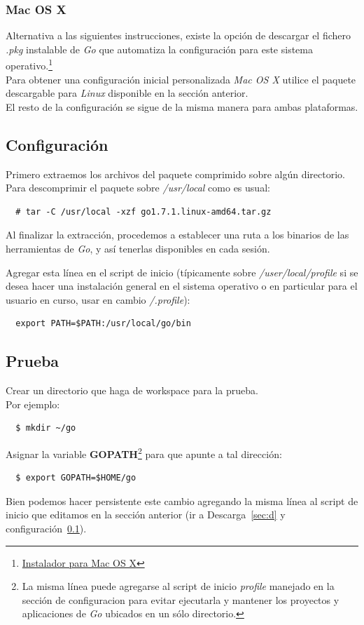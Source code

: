 \documentclass[12pt]{article}
\begin{document}
\subsubsection*{Mac OS X}
Alternativa a las siguientes instrucciones, existe la opción de descargar el fichero \textit{.pkg} instalable de \textit{Go} que automatiza la configuración para este sistema operativo.\footnote{\href{https://golang.org/doc/install?download=go1.7.1.darwin-amd64.pkg}{Instalador para Mac OS X}}\\[1mm]

Para obtener una configuración inicial personalizada \textit{Mac OS X} utilice el paquete descargable para \textit{Linux} disponible en la sección anterior.\\

El resto de la configuración se sigue de la misma manera para ambas plataformas.

\subsection{Configuración}\label{sec:c}
Primero extraemos los archivos del paquete comprimido sobre algún directorio.\\
Para descomprimir el paquete sobre \textit{/usr/local} como es usual:
\begin{verbatim}
  # tar -C /usr/local -xzf go1.7.1.linux-amd64.tar.gz
\end{verbatim}
Al finalizar la extracción, procedemos a establecer una ruta a los binarios de las herramientas de \textit{Go}, y así tenerlas disponibles en cada sesión.\par
Agregar esta línea en el script de inicio (típicamente sobre \textit{/user/local/profile}
si se desea hacer una instalación general en el sistema operativo o
en particular para el usuario en curso, usar en cambio \textit{/.profile}):
\begin{verbatim}
  export PATH=$PATH:/usr/local/go/bin
\end{verbatim}

\subsection{Prueba}
Crear un directorio que haga de workspace para la prueba.\\
Por ejemplo:
\begin{verbatim}
  $ mkdir ~/go
\end{verbatim}
Asignar la variable \textbf{GOPATH}\footnote{La misma línea puede agregarse al script de inicio \textit{profile} manejado en la sección de configuracion para evitar ejecutarla y mantener los proyectos y aplicaciones de \textit{Go} ubicados en un sólo directorio.}
para que apunte a tal dirección:
\begin{verbatim}
  $ export GOPATH=$HOME/go
\end{verbatim}
Bien podemos hacer persistente este cambio agregando la misma línea al script
de inicio que editamos en la sección anterior (ir a Descarga~\ref{sec:d} y configuración~\ref{sec:c}). \par
\end{document}
